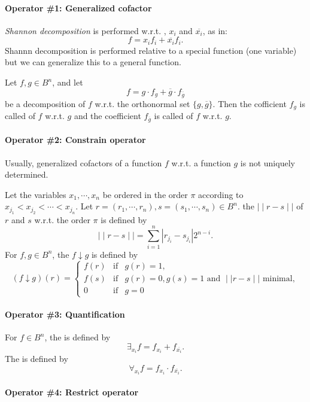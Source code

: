 \documentclass{memo}
\begin{document}
\paragraph{Operator \#1: Generalized cofactor}
{\em Shannon decomposition\/} is performed w.r.t. , $x_i$ and
$\overline{x_i}$, as in:
   \[ f = x_if_i + \overline{x_i}f_i.\]
Shannn decomposition is performed relative to a special function (one
variable) but we can generalize this to a general function.

Let $f, g \in B^n$, and let
   \[ f = g\cdot{f_g} + \overline{g}\cdot{f_{\overline{g}}}\]
be a decomposition of $f$ w.r.t. the orthonormal set $\{g, \overline{g}\}$. Then
the cofficient $f_g$ is called  of $f$
w.r.t. $g$ and the coefficient $f_{\overline{g}}$ is called  of $f$ w.r.t. $g$. 
\paragraph{Operator \#2: Constrain operator}
Usually, generalized cofactors of a function $f$ w.r.t. a function $g$ is not
uniquely determined.  

Let the variables $x_1, \cdots, x_n$ be ordered in the order $\pi$ according
to $x_{j_1} < x_{j_2} < \cdots < x_{j_n}$. Let $r = (r_1, \cdots, r_n), s =
(s_1, \cdots, s_n) \in B^n$. the  $\mid\mid r - s \mid\mid$ of
$r$ and $s$ w.r.t. the order $\pi$ is defined by
   \[ \mid\mid r - s \mid\mid = \sum_{i = 1}^n|r_{j_i} - s_{j_i}| 2^{n-i}.\]
For $f, g \in B^n$, the  $f \downarrow g$ is defined by
  \[  (f\downarrow g)(r) = \left\{ \begin{array}{lll}
   f(r) & \mbox{if} & g(r) = 1, \\
   f(s) & \mbox{if} & g(r) = 0, g(s) = 1 \mbox{\ and\ } \mid\mid{}r-s\mid\mid
   \mbox{\ minimal}, \\
   0 & \mbox{if} & g = 0
  \end{array}
  \right.\]
\paragraph{Operator \#3: Quantification}
For $f \in B^n$, the 
  is defined by
  \[ \exists_{x_i}f = f_{x_i} + f_{\overline{x_i}}.\]
The  is defined by
  \[ \forall_{x_i}f = f_{x_i} \cdot f_{\overline{x_i}}. \]

\paragraph{Operator \#4: Restrict operator}
\end{document}
